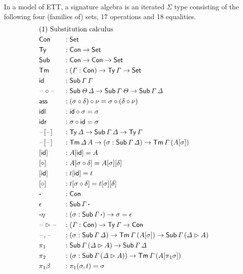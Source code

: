 \documentclass[a4paper,UKenglish,cleveref, autoref]{lipics-v2019}
\begin{document}
\begin{definition}\label{def:algebra}
  In a model of ETT, a signature algebra is an iterated $\Sigma$ type
  consisting of the following four (families of) sets, 17 operations
  and 18 equalities.
\begin{alignat*}{5}
  & \rlap{(1) Substitution calculus} \\
  & \Con && : \Set \\
  & \Ty  && : \Con\ra\Set \\
  & \Sub  && : \Con\ra\Con\ra\Set \\
  & \Tm  && : (\GG:\Con)\ra\Ty\,\GG\ra\Set \\
  & \id && : \Sub\,\GG\,\GG \\
  & \blank\circ\blank && : \Sub\,\GT\,\GD\ra\Sub\,\GG\,\GT\ra\Sub\,\GG\,\GD \\
  & \ass && : (\sigma \circ \delta) \circ \nu = \sigma \circ (\delta \circ \nu) \\
  & \idl && : \id\circ\sigma = \sigma \\
  & \idr && : \sigma\circ\id = \sigma \\
  & \blank[\blank] && : \Ty\,\GD\ra\Sub\,\GG\,\GD\ra\Ty\,\GG \\
  & \blank[\blank] && : \Tm\,\GD\,A\ra(\sigma:\Sub\,\GG\,\GD)\ra\Tm\,\GG\,(A[\sigma]) \\
  & [\id] && : A[\id] = A \\
  & [\circ] && : A[\sigma \circ \delta] = A[\sigma][\delta] \\
  & [\id] && : t[\id] = t \\
  & [\circ] && : t[\sigma \circ \delta] = t[\sigma][\delta] \\
  & \boldsymbol{\cdot} && : \Con \\
  & \epsilon && : \Sub\,\GG\,\boldsymbol{\cdot} \\
  & {\boldsymbol{\cdot}\eta} && : (\sigma : \Sub\,\GG\,\boldsymbol{\cdot}) \ra \sigma = \epsilon \\
  & \blank\ext\blank && : (\GG:\Con)\ra\Ty\,\GG\ra\Con \\
  & \blank,\blank && : (\sigma:\Sub\,\GG\,\GD)\ra\Tm\,\GG\,(A[\sigma])\ra\Sub\,\GG\,(\GD\ext A) \\
  & \pi_1 && : \Sub\,\GG\,(\GD\ext A)\ra \Sub\,\GG\,\GD \\
  & \pi_2 && : (\sigma : \Sub\,\GG\,(\GD\ext A))\ra \Tm\,\GG\,(A[\pi_1 \sigma]) \\
  & {\pi_1\beta} && : \pi_1(\sigma, t) = \sigma \\

\end{alignat*}
\end{definition}
\end{document}
